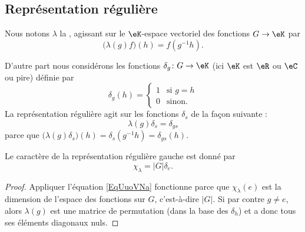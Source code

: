\subsection{Représentation régulière}

\begin{definition}		\label{DEFooGGPTooExTxWj}
	Nous notons \( \lambda\) la , agissant sur le \( \eK\)-espace vectoriel des fonctions \( G\to \eK\) par
	\begin{equation}
		\Big( \lambda(g)f \Big)(h)=f(g^{-1}h).
	\end{equation}
\end{definition}
D'autre part nous considérons les fonctions \( \delta_g\colon G\to \eK\) (ici \( \eK\) est \( \eR\) ou \( \eC\) ou pire) définie par
\begin{equation}
	\delta_g(h)=\begin{cases}
		1 & \text{si } g=h \\
		0 & \text{sinon.}
	\end{cases}
\end{equation}
La représentation régulière agit sur les fonctions \( \delta_s\) de la façon suivante :
\begin{equation}
	\lambda(g)\delta_s=\delta_{gs}
\end{equation}
parce que \( \big( \lambda(g)\delta_s \big)(h)=\delta_s(g^{-1}h)=\delta_{gs}(h)\).

\begin{lemma}		\label{LEMooGYIKooRRUxHq}
	Le caractère de la représentation régulière gauche est donné par
	\begin{equation}        \label{EqUuoVNa}
		\chi_{\lambda}=| G |\delta_e.
	\end{equation}
\end{lemma}

\begin{proof}
	Appliquer l'équation \eqref{EqUuoVNa} fonctionne parce que \( \chi_{\lambda}(e)\) est la dimension de l'espace des fonctions sur \( G\), c'est-à-dire \( | G |\). Si par contre \( g\neq e\), alors \( \lambda(g)\) est une matrice de permutation (dans la base des \( \delta_h\)) et a donc tous ses éléments diagonaux nuls.
\end{proof}

